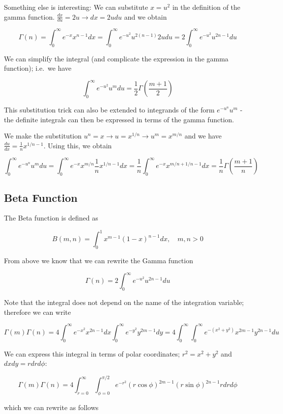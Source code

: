 Something else is interesting: We can substitute \(x=u^2\) in the
definition of the gamma function.
\(\frac{dx}{du}=2u \rightarrow dx=2u du\) and we obtain

\[
\Gamma(n) = \int_0^\infty e^{-x} x^{n-1} dx = \int_0^\infty e^{-u^2} u^{2(n-1)} 2u du = 2 \int_0^\infty e^{-u^2} u^{2n-1} du
\]

We can simplify the integral (and complicate the expression in the gamma
function); i.e.~we have

\[
\int_0^\infty e^{-u^2} u^m du = \frac{1}{2} \Gamma \left( \frac{m+1}{2} \right)
\]

This substitution trick can also be extended to integrands of the form
\(e^{-u^n} u^m\) - the definite integrals can then be expressed in terms
of the gamma function.

We make the substitution
\(u^n = x \rightarrow u=x^{1/n} \rightarrow u^m = x^{m/n}\) and we have
\(\frac{du}{dx} = \frac{1}{n}x^{1/n - 1}\). Using this, we obtain

\[
\int_0^\infty e^{-u^n} u^m du = \int_0^\infty e^{-x} x^{m/n} \frac{1}{n} x^{1/n-1} dx = \frac{1}{n} \int_0^\infty  e^{-x} x^{m/n + 1/n - 1} dx = \frac{1}{n} \Gamma \left( \frac{m+1}{n} \right)
\]

\subsection{Beta Function}

The Beta function is defined as

\[
B(m,n) = \int_0^1 x^{m-1} (1-x)^{n-1} dx, \quad m,n > 0
\]

From above we know that we can rewrite the Gamma function

\[
\Gamma(n) = 2 \int_0^\infty e^{-u^2} u^{2n-1} du
\]

Note that the integral does not depend on the name of the integration
variable; therefore we can write

\[
\Gamma(m) \Gamma(n) = 4 \int_0^\infty e^{-x^2} x^{2n-1} dx \int_0^\infty e^{-y^2} y^{2m-1} dy = 4 \int_0^\infty \int_0^\infty e^{-(x^2+y^2)} x^{2m-1} y^{2n-1} du
\]

We can express this integral in terms of polar coordinates;
\(r^2 = x^2 + y^2\) and \(dx dy = r dr d\phi\):

\[
\Gamma(m) \Gamma(n) = 4 \int_{r=0}^\infty \int_{\phi=0}^{\pi/2}  e^{-r^2} (r \cos \phi)^{2m-1} (r \sin \phi)^{2n-1} r dr d\phi
\]

which we can rewrite as follows

